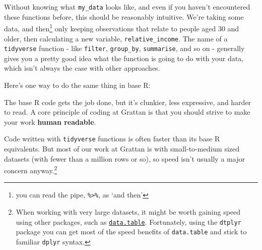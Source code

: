 \documentclass[]{book}
\newenvironment{Shaded}{\begin{snugshade}}{\end{snugshade}}
\newcommand{\DataTypeTok}[1]{\textcolor[rgb]{0.13,0.29,0.53}{#1}}
\newcommand{\DecValTok}[1]{\textcolor[rgb]{0.00,0.00,0.81}{#1}}
\newcommand{\KeywordTok}[1]{\textcolor[rgb]{0.13,0.29,0.53}{\textbf{#1}}}
\newcommand{\NormalTok}[1]{#1}
\newcommand{\OperatorTok}[1]{\textcolor[rgb]{0.81,0.36,0.00}{\textbf{#1}}}
\newcommand{\StringTok}[1]{\textcolor[rgb]{0.31,0.60,0.02}{#1}}
\begin{document}
\begin{Shaded}
\end{Shaded}

Without knowing what \texttt{my\_data} looks like, and even if you haven't encountered these functions before, this should be reasonably intuitive. We're taking some data, and then\footnote{you can read the pipe, \texttt{\%\textgreater{}\%}, as `and then'} only keeping observations that relate to people aged 30 and older, then calculating a new variable, \texttt{relative\_income}. The name of a \texttt{tidyverse} function - like \texttt{filter}, \texttt{group\_by}, \texttt{summarise}, and so on - generally gives you a pretty good idea what the function is going to do with your data, which isn't always the case with other approaches.

Here's one way to do the same thing in base R:

\begin{Shaded}
\end{Shaded}

The base R code gets the job done, but it's clunkier, less expressive, and harder to read. A core principle of coding at Grattan is that you should strive to make your work \textbf{human readable}.

Code written with \texttt{tidyverse} functions is often faster than its base R equivalents. But most of our work at Grattan is with small-to-medium sized datasets (with fewer than a million rows or so), so speed isn't usually a major concern anyway.\footnote{When working with very large datasets, it might be worth gaining speed using other packages, such as \href{https://cran.r-project.org/web/packages/data.table/vignettes/datatable-intro.html}{\texttt{data.table}}. Fortunately, using the \texttt{dtplyr} package you can get most of the speed benefits of \texttt{data.table} and stick to familiar \texttt{dplyr} syntax.}
\end{document}
